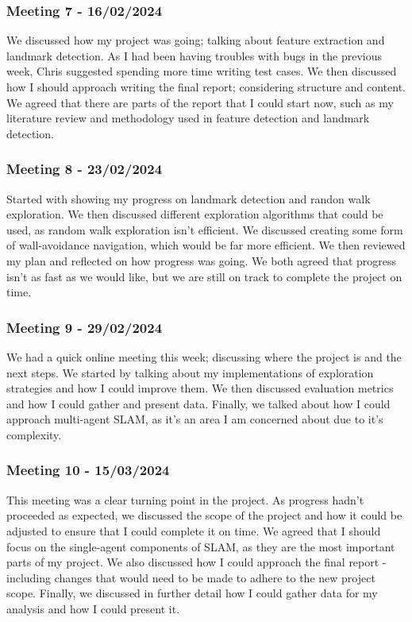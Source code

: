 \documentclass[12pt]{article}
\begin{document}
\subsubsection{Meeting 7 - 16/02/2024}
We discussed how my project was going; talking about feature extraction and landmark detection. As I had been having troubles
with bugs in the previous week, Chris suggested spending more time writing test cases. We then discussed how I should approach
writing the final report; considering structure and content. We agreed that there are parts of the report that I could start
now, such as my literature review and methodology used in feature detection and landmark detection.
\subsubsection{Meeting 8 - 23/02/2024}
Started with showing my progress on landmark detection and randon walk exploration. We then discussed different exploration
algorithms that could be used, as random walk exploration isn't efficient. We discussed creating some form of wall-avoidance
navigation, which would be far more efficient. We then reviewed my plan and reflected on how progress was going. We both
agreed that progress isn't as fast as we would like, but we are still on track to complete the project on time.
\subsubsection{Meeting 9 - 29/02/2024}
We had a quick online meeting this week; discussing where the project is and the next steps. We started by talking about
my implementations of exploration strategies and how I could improve them. We then discussed evaluation metrics and how I
could gather and present data. Finally, we talked about how I could approach multi-agent SLAM, as it's an area I am concerned
about due to it's complexity.
\subsubsection{Meeting 10 - 15/03/2024}
This meeting was a clear turning point in the project. As progress hadn't proceeded as expected, we discussed the scope of
the project and how it could be adjusted to ensure that I could complete it on time. We agreed that I should focus on the single-agent
components of SLAM, as they are the most important parts of my project. We also discussed how I could approach the final report -
including changes that would need to be made to adhere to the new project scope. Finally, we discussed in further detail how I could
gather data for my analysis and how I could present it.
\end{document}
